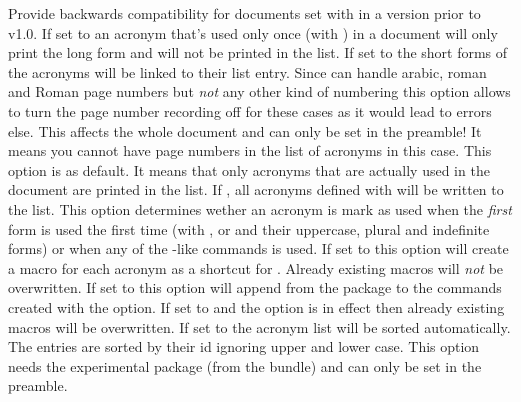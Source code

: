 \documentclass[DIV10,toc=index,toc=bib,hyperfootnotes=false]{cnpkgdoc}
\begin{document}
\begin{beschreibung}
   Provide backwards compatibility for documents set with \acro in a version
   prior to v1.0.
   If set to  an acronym that's used only once (with ) in a
   document will only print the long form and will not be printed in the list.
   If set to  the short forms of the acronyms will be linked to their
   list entry.
   Since \acro can handle arabic, roman and Roman page numbers but \emph{not}
   any other kind of numbering this option allows to turn the page number
   recording off for these cases as it would lead to errors else. This affects
   the whole document and can only be set in the preamble! It means you cannot
   have page numbers in the list of acronyms in this case.
   This option is  as default. It means that only acronyms that are
   actually used in the document are printed in the list. If , all
   acronyms defined with  will be written to the list.
   This option determines wether an acronym is mark as used when the \emph{first}
   form is used the first time (with ,  or  and
   their uppercase, plural and indefinite forms) or when any of the -like
   commands is used.   
   If set to  this option will create a macro  for each
   acronym as a shortcut for .  Already existing macros will
   \emph{not} be overwritten.
   If set to  this option will append 
   from the  package to the commands created with the 
   option.
   If set to  and the option  is in effect then
   already existing macros will be overwritten.
   If set to  the acronym list will be sorted automatically. The
   entries are sorted by their \acs{id} ignoring upper and lower case. This
   option needs the experimental package  (from the
    bundle) and can only be set in the preamble.

\end{beschreibung}
\end{document}
